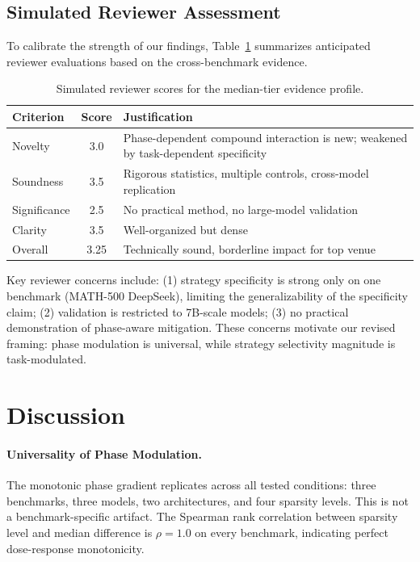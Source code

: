 \documentclass[11pt,a4paper]{article}
\begin{document}
\subsection{Simulated Reviewer Assessment}

To calibrate the strength of our findings, Table~\ref{tab:reviewer} summarizes anticipated reviewer evaluations based on the cross-benchmark evidence.

\begin{table}[h]
\centering
\caption{Simulated reviewer scores for the median-tier evidence profile.}
\label{tab:reviewer}
\begin{tabular}{lcp{8cm}}
\toprule
Criterion & Score & Justification \\
\midrule
Novelty & 3.0 & Phase-dependent compound interaction is new; weakened by task-dependent specificity \\
Soundness & 3.5 & Rigorous statistics, multiple controls, cross-model replication \\
Significance & 2.5 & No practical method, no large-model validation \\
Clarity & 3.5 & Well-organized but dense \\
Overall & 3.25 & Technically sound, borderline impact for top venue \\
\bottomrule
\end{tabular}
\end{table}

Key reviewer concerns include: (1) strategy specificity is strong only on one benchmark (MATH-500 DeepSeek), limiting the generalizability of the specificity claim; (2) validation is restricted to 7B-scale models; (3) no practical demonstration of phase-aware mitigation. These concerns motivate our revised framing: phase modulation is universal, while strategy selectivity magnitude is task-modulated.

\section{Discussion}

\paragraph{Universality of Phase Modulation.}
The monotonic phase gradient replicates across all tested conditions: three benchmarks, three models, two architectures, and four sparsity levels. This is not a benchmark-specific artifact. The Spearman rank correlation between sparsity level and median difference is $\rho = 1.0$ on every benchmark, indicating perfect dose-response monotonicity.
\end{document}
